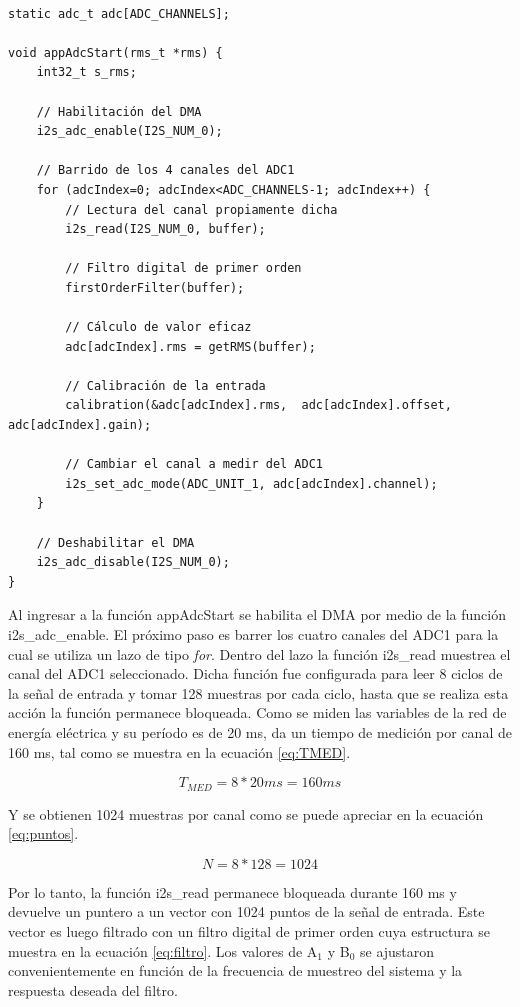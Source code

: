 \begin{lstlisting}[label=cod:adc_c,caption=Pseudocódigo del módulo adc.c.]

static adc_t adc[ADC_CHANNELS];

void appAdcStart(rms_t *rms) {
	int32_t s_rms;
	
	// Habilitación del DMA 
	i2s_adc_enable(I2S_NUM_0);

	// Barrido de los 4 canales del ADC1
	for (adcIndex=0; adcIndex<ADC_CHANNELS-1; adcIndex++) {		
		// Lectura del canal propiamente dicha
		i2s_read(I2S_NUM_0, buffer);
		
		// Filtro digital de primer orden
		firstOrderFilter(buffer);

		// Cálculo de valor eficaz
		adc[adcIndex].rms = getRMS(buffer);
		
		// Calibración de la entrada 
		calibration(&adc[adcIndex].rms,  adc[adcIndex].offset, adc[adcIndex].gain);
		
		// Cambiar el canal a medir del ADC1
		i2s_set_adc_mode(ADC_UNIT_1, adc[adcIndex].channel);
	}
	
	// Deshabilitar el DMA
	i2s_adc_disable(I2S_NUM_0);
}
\end{lstlisting}

Al ingresar a la función appAdcStart se habilita el DMA por medio de la función i2s\_adc\_enable. El próximo paso es barrer los cuatro canales del ADC1 para la cual se utiliza un lazo de tipo \textit{for}. Dentro del lazo la función i2s\_read muestrea el canal del ADC1 seleccionado. Dicha función fue configurada para leer 8 ciclos de la señal de entrada y tomar 128 muestras por cada ciclo, hasta que se realiza esta acción la función permanece bloqueada. Como se miden las variables de la red de energía eléctrica y su período es de 20 ms, da un tiempo de medición por canal de 160 ms, tal como se muestra en la ecuación \ref{eq:TMED}.

\begin{equation}
	\label{eq:TMED}
	T_{MED} = 8 * 20 ms = 160 ms
\end{equation}

Y se obtienen 1024 muestras por canal como se puede apreciar en la ecuación \ref{eq:puntos}.

\begin{equation}
	\label{eq:puntos}
	N = 8 * 128 = 1024
\end{equation}

Por lo tanto, la función i2s\_read permanece bloqueada durante 160 ms y devuelve un puntero a un vector con 1024 puntos de la señal de entrada. Este vector es luego filtrado con un filtro digital de primer orden cuya estructura se muestra en la ecuación \ref{eq:filtro}. Los valores de A$_{1}$ y B$_{0}$ se ajustaron convenientemente en función de la frecuencia de muestreo del sistema y la respuesta deseada del filtro.

